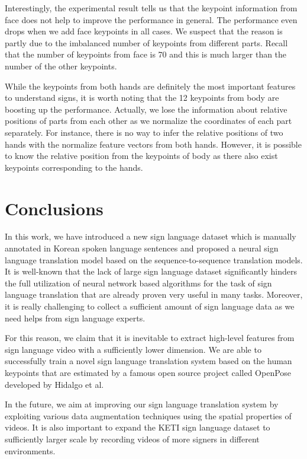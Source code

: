 \documentclass[10pt,twocolumn,letterpaper]{article}
\begin{document}
Interestingly, the experimental result tells us that the keypoint information from face does not help to improve the performance in general. The performance even drops when we add face keypoints in all cases. We suspect that the reason is partly due to the imbalanced number of keypoints from different parts. Recall that the number of keypoints from face is 70 and this is much larger than the number of the other keypoints.

While the keypoints from both hands are definitely the most important features to understand signs, it is worth noting that the 12 keypoints from body are boosting up the performance. Actually, we lose the information about relative positions of parts from each other as we normalize the coordinates of each part separately. For instance, there is no way to infer the relative positions of two hands with the normalize feature vectors from both hands. However, it is possible to know the relative position from the keypoints of body as there also exist keypoints corresponding to the hands.

\section{Conclusions}
In this work, we have introduced a new sign language dataset which is manually annotated in Korean spoken language sentences and proposed a neural sign language translation model based on the sequence-to-sequence translation models. It is well-known that the lack of large sign language dataset significantly hinders the full utilization of neural network based algorithms for the task of sign language translation that are already proven very useful in many tasks. Moreover, it is really challenging to collect a sufficient amount of sign language data as we need helps from sign language experts.

For this reason, we claim that it is inevitable to extract high-level features from sign language video with a sufficiently lower dimension. We are able to successfully train a novel sign language translation system based on the human keypoints that are estimated by a famous open source project called OpenPose developed by Hidalgo et al.

In the future, we aim at improving our sign language translation system by exploiting various data augmentation techniques using the spatial properties of videos. It is also important to expand the KETI sign language dataset to sufficiently larger scale by recording videos of more signers in different environments.
\end{document}
